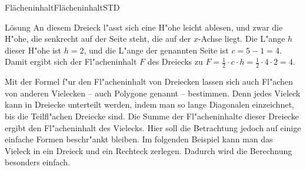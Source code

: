 \begin{MXContent}{Fl\"acheninhalt}{Fl\"acheninhalt}{STD}
\begin{MExercise}
\begin{center}
\end{center}

\begin{MHint}{L\"osung}
An diesem Dreieck l"asst sich eine H"ohe leicht ablesen, und zwar die H"ohe,
die senkrecht auf der Seite steht, die auf der $x$-Achse liegt. 
Die L"ange $h$ dieser H"ohe ist $h = 2$, und die L"ange der genannten Seite 
ist $c = 5 - 1 = 4$. Damit ergibt sich der Fl"acheninhalt $F$ des Dreiecks zu
$F = \frac{1}{2} \cdot c \cdot h = \frac{1}{2} \cdot 4 \cdot 2 = 4$.
\end{MHint}
\end{MExercise}

Mit der Formel f"ur den Fl"acheninhalt von Dreiecken lassen sich auch Fl"achen 
von anderen Vielecken -- auch Polygone genannt -- bestimmen. 
Denn jedes Vieleck kann in Dreiecke unterteilt werden, indem man so 
lange Diagonalen einzeichnet, bis die Teilfl"achen Dreiecke sind.
Die Summe der Fl"acheninhalte dieser Dreiecke ergibt den Fl"acheninhalt des 
Vielecks. 
Hier soll die Betrachtung jedoch auf einige einfache Formen beschr"ankt bleiben. 
Im folgenden Beispiel kann man das Vieleck in ein Dreieck und ein Rechteck 
zerlegen. Dadurch wird die Berechnung besonders einfach.


\end{MXContent}
